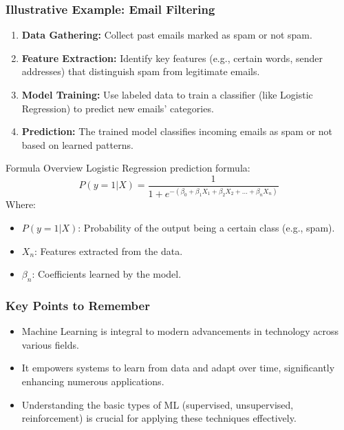 \documentclass{beamer}
\begin{document}
\begin{frame}[fragile]
    \frametitle{Illustrative Example: Email Filtering}
    \begin{enumerate}
        \item \textbf{Data Gathering:} Collect past emails marked as spam or not spam.
        \item \textbf{Feature Extraction:} Identify key features (e.g., certain words, sender addresses) that distinguish spam from legitimate emails.
        \item \textbf{Model Training:} Use labeled data to train a classifier (like Logistic Regression) to predict new emails' categories.
        \item \textbf{Prediction:} The trained model classifies incoming emails as spam or not based on learned patterns.
    \end{enumerate}
    
    \begin{block}{Formula Overview}
        Logistic Regression prediction formula:
        \begin{equation}
            P(y=1|X) = \frac{1}{1 + e^{-(\beta_0 + \beta_1X_1 + \beta_2X_2 + ... + \beta_nX_n)}}
        \end{equation}
        Where:
        \begin{itemize}
            \item \(P(y=1|X)\): Probability of the output being a certain class (e.g., spam).
            \item \(X_n\): Features extracted from the data.
            \item \(\beta_n\): Coefficients learned by the model.
        \end{itemize}
    \end{block}
\end{frame}

\begin{frame}[fragile]
    \frametitle{Key Points to Remember}
    \begin{itemize}
        \item Machine Learning is integral to modern advancements in technology across various fields.
        \item It empowers systems to learn from data and adapt over time, significantly enhancing numerous applications.
        \item Understanding the basic types of ML (supervised, unsupervised, reinforcement) is crucial for applying these techniques effectively.
    \end{itemize}
\end{frame}
\end{document}
